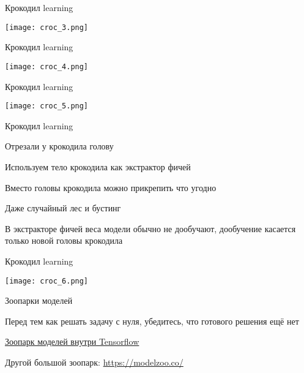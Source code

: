 \documentclass[notes,12pt, aspectratio=169]{beamer}
\newenvironment{wideitemize}{\itemize\addtolength{\itemsep}{10pt}}{\enditemize}
\begin{document}
\begin{frame}{Крокодил learning}
\begin{center}
\texttt{[image: croc\_3.png]}
\end{center}
\end{frame}

\begin{frame}{Крокодил learning}
\begin{center}
\texttt{[image: croc\_4.png]}
\end{center}
\end{frame}

\begin{frame}{Крокодил learning}
\begin{center}
\texttt{[image: croc\_5.png]}
\end{center}
\end{frame}

\begin{frame}{Крокодил learning}
\begin{wideitemize}
\item Отрезали у крокодила голову
\item  Используем тело крокодила как экстрактор фичей
\item  Вместо головы крокодила можно прикрепить что угодно 
\item  Даже случайный лес и бустинг
\item В экстракторе фичей веса модели обычно не дообучают, дообучение касается только новой головы крокодила
\end{wideitemize}
\end{frame}

\begin{frame}{Крокодил learning}
\begin{center}
\texttt{[image: croc\_6.png]}
\end{center}
\end{frame}


\begin{frame}{Зоопарки моделей}
\begin{wideitemize}
\item Перед тем как решать задачу с нуля, убедитесь, что готового решения ещё нет
\item  {\color{blue} \href{https://tfhub.dev/}{Зоопарк моделей внутри Tensorflow} }
\item Другой большой зоопарк: {\color{blue} \url{https://modelzoo.co/}}
\end{wideitemize}
\end{frame}
\end{document}
